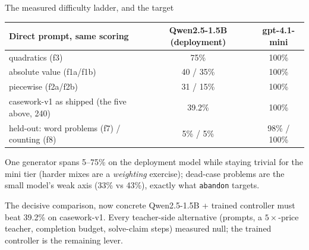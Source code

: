 \documentclass[aspectratio=169]{beamer}
\newcommand{\verbword}[1]{\texttt{#1}}
\begin{document}
\begin{frame}{The measured difficulty ladder, and the target}
  \begin{center}
    \footnotesize
    \begin{tabular}{@{}lcc@{}}
      \toprule
      Direct prompt, same scoring & Qwen2.5-1.5B (deployment) & gpt-4.1-mini \\
      \midrule
      quadratics (f3) & 75\% & 100\% \\
      absolute value (f1a/f1b) & 40 / 35\% & 100\% \\
      piecewise (f2a/f2b) & 31 / 15\% & 100\% \\
      casework-v1 as shipped (the five above, 240) & \alert{39.2\%} & 100\% \\
      \midrule
      held-out: word problems (f7) / counting (f8) & 5\% / 5\% & 98\% / 100\% \\
      \bottomrule
    \end{tabular}
  \end{center}
  \smallskip
  One generator spans 5--75\% on the deployment model while staying
  trivial for the mini tier (harder mixes are a \emph{weighting}
  exercise); dead-case problems are the small model's weak axis (33\% vs
  43\%), exactly what \verbword{abandon} targets.
  \begin{block}{The decisive comparison, now concrete}
    Qwen2.5-1.5B + trained controller must beat \alert{39.2\%} on
    casework-v1. Every teacher-side alternative (prompts, a
    $5\times$-price teacher, completion budget, solve-claim steps)
    measured null; the trained controller is the remaining lever.
  \end{block}
\end{frame}
\end{document}
